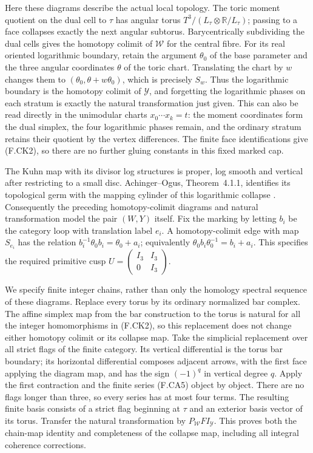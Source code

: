 Here these diagrams describe the actual local topology.
The toric moment quotient on the dual cell to $\tau$ has
angular torus $T^3/(L_\tau\otimes\mathbb R/L_\tau)$;
passing to a face collapses exactly the next angular
subtorus.  Barycentrically subdividing the dual cells gives
the homotopy colimit of $\mathcal W$ for the central fibre.
For its real oriented logarithmic boundary, retain the
argument $\theta_0$ of the base parameter and the three
angular coordinates $\theta$ of the toric chart.  Translating
the chart by $w$ changes them to
$(\theta_0,\theta+w\theta_0)$, which is precisely $S_w$.
Thus the logarithmic boundary is the homotopy colimit of
$\mathcal Y$, and forgetting the logarithmic phases on each
stratum is exactly the natural transformation just given.
This can also be read directly in the unimodular charts
$x_0\cdots x_k=t$: the moment coordinates form the dual
simplex, the four logarithmic phases remain, and the ordinary
stratum retains their quotient by the vertex differences.
The finite face identifications give (F.CK2), so there are
no further gluing constants in this fixed marked cap.

The Kuhn map with its divisor log structures is proper,
log smooth and vertical after restricting to a small disc.
Achinger--Ogus, Theorem~4.1.1, identifies its topological germ
with the mapping cylinder of this logarithmic collapse
\cite{ffAchingerOgus20}.  Consequently the preceding
homotopy-colimit diagrams and natural transformation model
the pair $(W,Y)$ itself.  Fix the marking by letting $b_i$
be the category loop with translation label $e_i$.  A
homotopy-colimit edge with map $S_{e_i}$ has the relation
$b_i^{-1}\theta_0b_i=\theta_0+a_i$; equivalently
$\theta_0b_i\theta_0^{-1}=b_i+a_i$.  This specifies the
required primitive cusp
$U=\begin{pmatrix}I_3&I_3\\0&I_3\end{pmatrix}$.

We specify finite integer chains, rather than only the
homology spectral sequence of these diagrams.  Replace every
torus by its ordinary normalized bar complex.  The affine
simplex map from the bar construction to the torus is natural
for all the integer homomorphisms in (F.CK2), so this replacement
does not change either homotopy colimit or its collapse map.
Take the simplicial replacement over all strict flags of the
finite category.  Its vertical differential is the torus bar
boundary; its horizontal differential composes adjacent
arrows, with the first face applying the diagram map, and
has the sign $(-1)^q$ in vertical degree $q$.
Apply the first contraction and the finite series (F.CA5)
object by object.  There are no flags longer than three,
so every series has at most four terms.  The resulting
finite basis consists of a strict flag beginning at $\tau$
and an exterior basis vector of its torus.  Transfer the
natural transformation by $P_{\mathcal W}FI_{\mathcal Y}$.
This proves both the chain-map identity and completeness of
the collapse map, including all integral coherence corrections.

